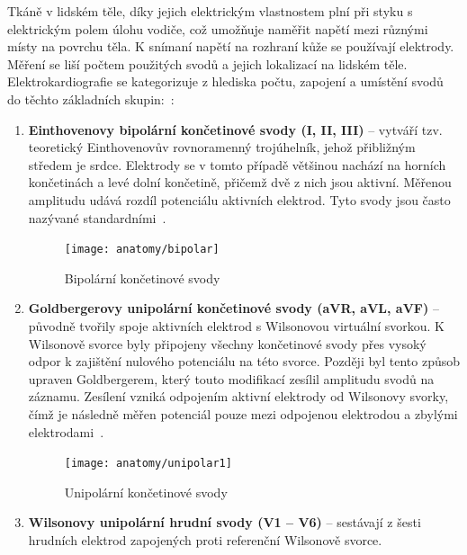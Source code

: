 Tkáně v lidském těle, díky jejich elektrickým vlastnostem plní při styku s
elektrickým polem úlohu vodiče, což umožňuje naměřit napětí mezi různými místy
na povrchu těla. K snímaní napětí na rozhraní kůže se používají elektrody.
Měření se liší počtem použitých svodů a jejich lokalizací na lidském těle.
Elektrokardiografie se kategorizuje z hlediska počtu, zapojení a umístění svodů
do těchto základních skupin:~\cite{Haberl2012,Kittnar2020}:
\begin{enumerate}
	\item \textbf{Einthovenovy bipolární končetinové svody (I, II, III)} --
	      vytváří tzv. teoretický Einthovenovův rovnoramenný trojúhelník, jehož
	      přibližným středem je srdce. Elektrody se v tomto případě většinou
	      nachází na horních končetinách a levé dolní končetině, přičemž dvě z
	      nich jsou aktivní. Měřenou amplitudu udává rozdíl potenciálu
	      aktivních elektrod. Tyto svody jsou často nazývané
	      standardními~\cite{Kittnar2020}.
	      \begin{figure}[h]
		      \begin{center}
			      \texttt{[image: anatomy/bipolar]}
			      \caption{Bipolární končetinové svody~\cite{Kittnar2020}}
			      \label{fig:bipolar}
		      \end{center}
	      \end{figure}
	\item \textbf{Goldbergerovy unipolární končetinové svody (aVR, aVL, aVF)} --
	      původně tvořily spoje aktivních elektrod s Wilsonovou virtuální
	      svorkou. K Wilsonově svorce byly připojeny všechny končetinové svody
	      přes vysoký odpor k zajištění nulového potenciálu na této svorce.
	      Později byl tento způsob upraven Goldbergerem, který touto modifikací
	      zesílil amplitudu svodů na záznamu. Zesílení vzniká odpojením aktivní
	      elektrody od Wilsonovy svorky, čímž je následně měřen potenciál pouze
	      mezi odpojenou elektrodou a zbylými elektrodami~\cite{Kittnar2020}.
	      \begin{figure}[H]
		      \begin{center}
			      \texttt{[image: anatomy/unipolar1]}
			      \caption{Unipolární končetinové svody~\cite{Kittnar2020}}
			      \label{fig:unipolar1}
		      \end{center}
	      \end{figure}
	\item \textbf{Wilsonovy unipolární hrudní svody (V1 -- V6)} -- sestávají z
	      šesti hrudních elektrod zapojených proti referenční Wilsonově svorce.

\end{enumerate}
